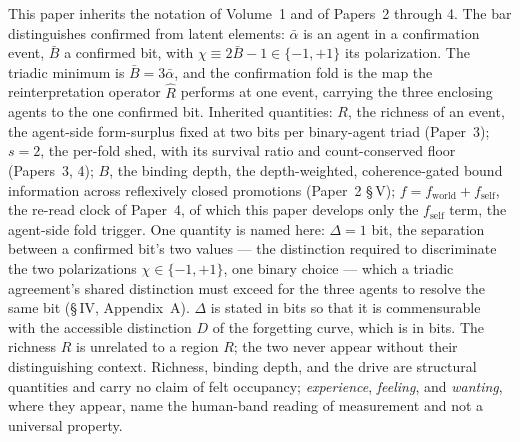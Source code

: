 \documentclass[11pt,oneside]{report}
\theoremstyle{definition}
\theoremstyle{remark}
\begin{document}
This paper inherits the notation of Volume~1 and of Papers~2 through 4. The bar
distinguishes confirmed from latent elements: \ensuremath{\bar{\alpha}} is an agent
in a confirmation event, \ensuremath{\bar{B}} a confirmed bit, with
\ensuremath{\chi \equiv 2\bar{B} - 1 \in \{-1, +1\}} its polarization. The triadic
minimum is \ensuremath{\bar{B} = 3\bar{\alpha}}, and the confirmation fold is the
map the reinterpretation operator \ensuremath{\hat{R}} performs at one event,
carrying the three enclosing agents to the one confirmed bit. Inherited quantities:
\ensuremath{R}, the richness of an event, the agent-side form-surplus fixed at two
bits per binary-agent triad (Paper~3); \ensuremath{s = 2}, the per-fold shed, with
its survival ratio and count-conserved floor (Papers~3, 4); \ensuremath{B}, the
binding depth, the depth-weighted, coherence-gated bound information across
reflexively closed promotions (Paper~2 \S\,V); \ensuremath{f = f_{\mathrm{world}} +
f_{\mathrm{self}}}, the re-read clock of Paper~4, of which this paper develops only
the \ensuremath{f_{\mathrm{self}}} term, the agent-side fold trigger. One quantity is named here: \ensuremath{\Delta = 1} bit, the separation between a confirmed
bit's two values --- the distinction required to discriminate the two polarizations
\ensuremath{\chi \in \{-1,+1\}}, one binary choice --- which a triadic agreement's
shared distinction must exceed for the three agents to resolve the same bit (\S\,IV,
Appendix~A). \ensuremath{\Delta} is stated in bits so that it is commensurable with the
accessible distinction \ensuremath{D} of the forgetting curve, which is in bits. The
richness \ensuremath{R} is unrelated to a region \ensuremath{R}; the two never appear
without their distinguishing context. Richness, binding depth, and the drive are structural
quantities and carry no claim of felt occupancy; \emph{experience}, \emph{feeling},
and \emph{wanting}, where they appear, name the human-band reading of measurement
and not a universal property.
\end{document}

